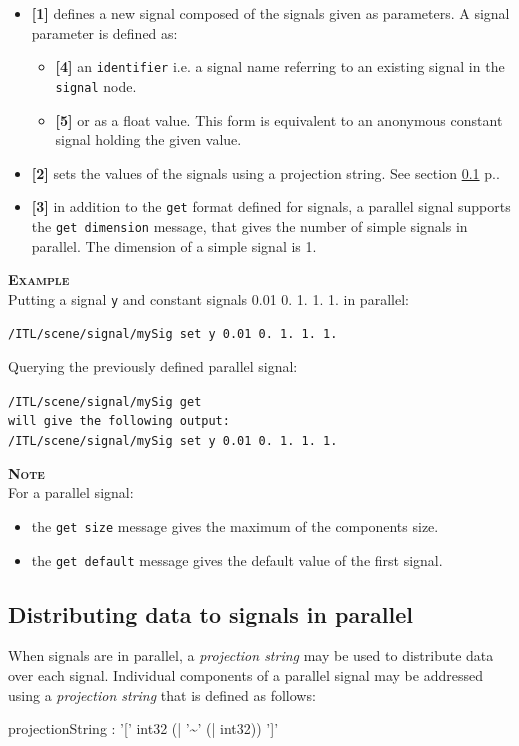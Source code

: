 \documentclass[a4paper,twoside]{report}
\newcommand{\subsublevel}[1]	{\subsection{#1}}
\newcommand{\fullref}[1]	{\ref{#1} p.\pageref{#1}}
\newcommand{\OSC}[1]		{\texttt{#1}}
\newcommand{\example}		{\textbf{\hspace{-1.5cm}\textbf{\textsc{Example }}}}
\newcommand{\note}	[1]		{\vspace{2mm}\textbf{\hspace{-1.03cm}\textbf{\textsc{Note #1}}}}
\newcommand{\sample}	[1]			{\vspace{-2mm}\begin{center}\colorbox{mygrey}{
								\begin{minipage}[t]{0.9\columnwidth} 
								{\small \texttt{#1}}
								\end{minipage}}\end{center}}
\begin{document}
\begin{itemize}
\item \textbf{[1]} defines a new signal composed of the signals given as parameters. A signal parameter is defined as:

\begin{itemize}
\item \textbf{[4]} an \OSC{identifier} i.e. a signal name referring to an existing signal in the \OSC{signal} node. 
\item \textbf{[5]} or as a float value. This form is equivalent to an anonymous constant signal holding the given value. 
\end{itemize}

\item \textbf{[2]} sets the values of the signals using a projection string. See section \fullref{sigproj}. 
\item \textbf{[3]} in addition to the \OSC{get} format defined for signals, a parallel signal supports the \OSC{get dimension} message, that gives the number of simple signals in parallel. The dimension of a simple signal is 1. 
\end{itemize}

\example \\
Putting a signal \OSC{y} and constant signals 0.01 0. 1. 1. 1. in parallel:
\sample{/ITL/scene/signal/mySig set y 0.01 0. 1. 1. 1.}
Querying the previously defined parallel signal:
\sample{/ITL/scene/signal/mySig get \\
will give the following output: \\
/ITL/scene/signal/mySig set y 0.01 0. 1. 1. 1.
}

\note{} \\
For a parallel signal:
\begin{itemize}
\item the \OSC{get size} message gives the maximum of the components size. 
\item the \OSC{get default} message gives the default value of the first signal. 
\end{itemize}

\subsublevel{Distributing data to signals in parallel}
\label{sigproj}

When signals are in parallel, a \emph{projection string} may be used to distribute data over each signal.
Individual components of a parallel signal may be addressed using a \emph{projection string} that is defined as follows:
\begin{rail}
projectionString :  '[' int32 (| '\~{}' (| int32)) ']'
\end{rail}
\end{document}
